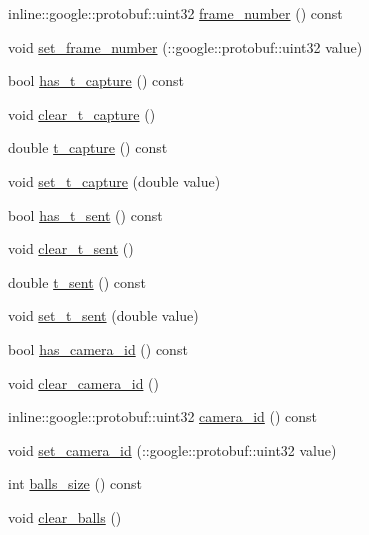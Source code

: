 \begin{DoxyCompactItemize}
\item 
inline\-::google\-::protobuf\-::uint32 \hyperlink{class_s_s_l___detection_frame_a04873bf9dda937ae896cf0a07b2234b9}{frame\-\_\-number} () const 
\item 
void \hyperlink{class_s_s_l___detection_frame_ae79057ad051b05c675515f74db71017f}{set\-\_\-frame\-\_\-number} (\-::google\-::protobuf\-::uint32 value)
\item 
bool \hyperlink{class_s_s_l___detection_frame_aae528d1a62a8793d970b66776d0a1983}{has\-\_\-t\-\_\-capture} () const 
\item 
void \hyperlink{class_s_s_l___detection_frame_a7e74385f32c85d4d0024e9817153346e}{clear\-\_\-t\-\_\-capture} ()
\item 
double \hyperlink{class_s_s_l___detection_frame_ac71a297eeef94c8706ff92e6d30ce233}{t\-\_\-capture} () const 
\item 
void \hyperlink{class_s_s_l___detection_frame_a4d6361b1e5c5fcf29aed952894c17e0a}{set\-\_\-t\-\_\-capture} (double value)
\item 
bool \hyperlink{class_s_s_l___detection_frame_a42bae63d5b23bfcdbdc3d4ee82f224e4}{has\-\_\-t\-\_\-sent} () const 
\item 
void \hyperlink{class_s_s_l___detection_frame_a513398cccfc928b3d26674a88f8ff59d}{clear\-\_\-t\-\_\-sent} ()
\item 
double \hyperlink{class_s_s_l___detection_frame_a2018392f1d9b6b0dc2013864ddb90ba8}{t\-\_\-sent} () const 
\item 
void \hyperlink{class_s_s_l___detection_frame_a915dde670da2dd5654c9b81a040351c7}{set\-\_\-t\-\_\-sent} (double value)
\item 
bool \hyperlink{class_s_s_l___detection_frame_a35c9c396403e48bb1983a387701f2fe3}{has\-\_\-camera\-\_\-id} () const 
\item 
void \hyperlink{class_s_s_l___detection_frame_a60ab5ef53f0e96bb3adb79594c3ebae9}{clear\-\_\-camera\-\_\-id} ()
\item 
inline\-::google\-::protobuf\-::uint32 \hyperlink{class_s_s_l___detection_frame_a4a2f074ae63f43c3a1192935ceb39155}{camera\-\_\-id} () const 
\item 
void \hyperlink{class_s_s_l___detection_frame_a18c491e8a8a89ef849e2e03b7b7631cb}{set\-\_\-camera\-\_\-id} (\-::google\-::protobuf\-::uint32 value)
\item 
int \hyperlink{class_s_s_l___detection_frame_af484a7b23e8aa13810a6719201163a29}{balls\-\_\-size} () const 
\item 
void \hyperlink{class_s_s_l___detection_frame_a17d4bc2f3aa9f5e82aae97b2f1ba7c04}{clear\-\_\-balls} ()

\end{DoxyCompactItemize}
